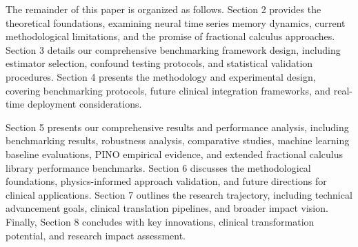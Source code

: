 The remainder of this paper is organized as follows. Section 2 provides the theoretical foundations, examining neural time series memory dynamics, current methodological limitations, and the promise of fractional calculus approaches. Section 3 details our comprehensive benchmarking framework design, including estimator selection, confound testing protocols, and statistical validation procedures. Section 4 presents the methodology and experimental design, covering benchmarking protocols, future clinical integration frameworks, and real-time deployment considerations.

Section 5 presents our comprehensive results and performance analysis, including benchmarking results, robustness analysis, comparative studies, machine learning baseline evaluations, PINO empirical evidence, and extended fractional calculus library performance benchmarks. Section 6 discusses the methodological foundations, physics-informed approach validation, and future directions for clinical applications. Section 7 outlines the research trajectory, including technical advancement goals, clinical translation pipelines, and broader impact vision. Finally, Section 8 concludes with key innovations, clinical transformation potential, and research impact assessment.
